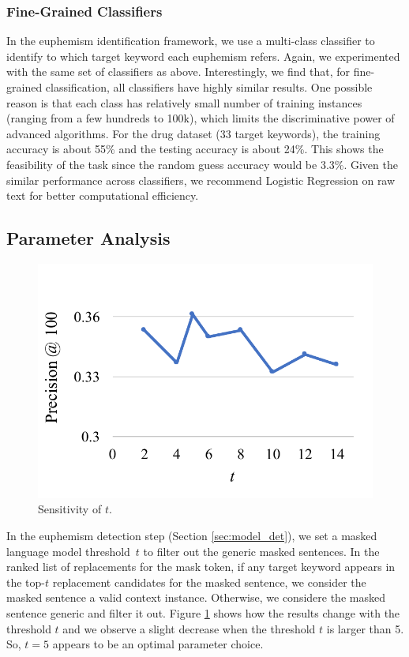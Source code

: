 \subsubsection{Fine-Grained Classifiers}
\label{sec:ablation_fine-grained}
In the euphemism identification framework, we use a multi-class classifier to identify to which target keyword each euphemism refers. 
Again, we experimented with the same set of classifiers as above.
Interestingly, we find that, for fine-grained classification, 
all classifiers have highly similar results. 
One possible reason is that each class has relatively small number of training instances (ranging from a few hundreds to 100k), which limits the discriminative power of advanced algorithms. 
For the drug dataset (33 target keywords), the training accuracy is about 55\% and the testing accuracy is about 24\%. 
This shows the feasibility of the task since the random guess accuracy would be 3.3\%. 
Given the similar performance across  classifiers, we recommend  Logistic Regression on raw text for better computational efficiency. 



\subsection{Parameter Analysis}
\label{sec:dis_parameter_analysis}
\begin{figure}[ht!]
	\centering
	\vspace{-0.5cm}
	\includegraphics[width=0.7\linewidth]{figures/12}
	\caption{Sensitivity of $t$.}
	\label{fig:12}
\end{figure}

In the euphemism detection step 
(Section \ref{sec:model_det}), 
we set a masked language model threshold~$t$ to filter out the generic masked sentences. 
In the ranked list of replacements for the mask token, if any target keyword appears in the top-$t$ 
replacement candidates for the masked sentence, 
we consider  the masked sentence a valid context instance. %
Otherwise, we considere  the masked sentence generic and filter it out. 
Figure \ref{fig:12} shows how the results change with the threshold $t$ and we observe a slight decrease when the threshold $t$ is larger than 5. So, $t=5$ appears to be an optimal parameter choice.


